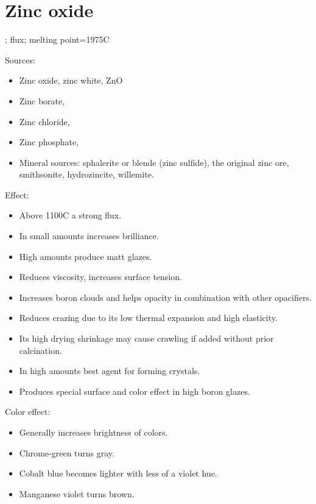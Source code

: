 \section{Zinc oxide}
; flux; melting point=1975\degree C

Sources:
\begin{itemize}
  \item Zinc oxide, zinc white, ZnO
  \item Zinc borate, 
  \item Zinc chloride, 
  \item Zinc phosphate, 
  \item Mineral sources: sphalerite or blende (zinc sulfide), the original zinc 
  ore, smithsonite, hydrozincite, willemite.
\end{itemize}
Effect:
\begin{itemize}
  \item Above 1100\degree C a strong flux.
  \item In small amounts increases brilliance.
  \item High amounts produce matt glazes.
  \item Reduces viscosity, increases surface tension.
  \item Increases boron clouds and helps opacity in combination with other 
  opacifiers.
  \item Reduces crazing due to its low thermal expansion and high elasticity.
  \item Its high drying shrinkage may cause crawling if added without prior 
  calcination.
  \item In high amounts best agent for forming crystals.
  \item Produces special surface and color effect in high boron glazes.
\end{itemize}
Color effect:
\begin{itemize}
  \item Generally increases brightness of colors.
  \item Chrome-green turns gray.
  \item Cobalt blue becomes lighter with less of a violet hue.
  \item Manganese violet turns brown.
\end{itemize}
